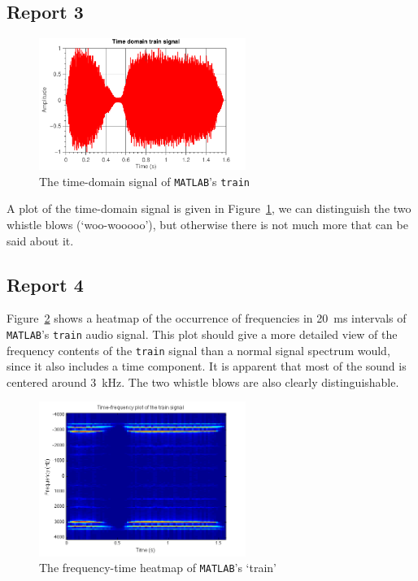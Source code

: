 \documentclass[11pt,titlepage]{report}
\begin{document}
\subsection{Report 3}

\begin{figure}[H]
	\centering
	\includegraphics[width=0.6\textwidth]{../../deliverable-7-resources/figures/ass-1/report-3/ass-1-report-3.pdf}
	\caption{The time-domain signal of \texttt{MATLAB}'s \texttt{train}}
	\label{fig:rep3-train-time}
\end{figure}

A plot of the time-domain signal is given in Figure~\ref{fig:rep3-train-time}, we can distinguish the two whistle blows (`woo-wooooo'), but otherwise there is not much more that can be said about it.

\subsection{Report 4}
Figure~\ref{fig:rep4-train-heatmap} shows a heatmap of the occurrence of frequencies in \SI{20}{\milli\second} intervals of \texttt{MATLAB}'s \texttt{train} audio signal. This plot should give a more detailed view of the frequency contents of the \texttt{train} signal than a normal signal spectrum would, since it also includes a time component. It is apparent that most of the sound is centered around \SI{3}{\kilo\hertz}. The two whistle blows are also clearly distinguishable.

\begin{figure}[H]
	\centering
	\includegraphics[width=0.6\textwidth]{../../deliverable-7-resources/figures/ass-1/report-4/ass-1-report-4.png}
	\caption{The frequency-time heatmap of \texttt{MATLAB}'s `train'}
	\label{fig:rep4-train-heatmap}
\end{figure}
\end{document}
